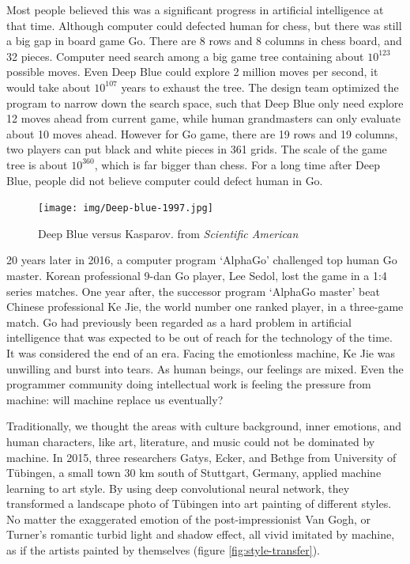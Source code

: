 \documentclass{article}
\begin{document}
Most people believed this was a significant progress in artificial intelligence at that time. Although computer could defected human for chess, but there was still a big gap in board game Go. There are 8 rows and 8 columns in chess board, and 32 pieces. Computer need search among a big game tree containing about $10^{123}$ possible moves. Even Deep Blue could explore 2 million moves per second, it would take about $10^{107}$ years to exhaust the tree. The design team optimized the program to narrow down the search space, such that Deep Blue only need explore 12 moves ahead from current game, while human grandmasters can only evaluate about 10 moves ahead. However for Go game, there are 19 rows and 19 columns, two players can put black and white pieces in 361 grids. The scale of the game tree is about $10^{360}$, which is far bigger than chess. For a long time after Deep Blue, people did not believe computer could defect human in Go.

\begin{figure}[htbp]
 \centering
 \texttt{[image: img/Deep-blue-1997.jpg]}
 \captionsetup{labelformat=empty}
 \caption{Deep Blue versus Kasparov. from {\em Scientific American}}
 \label{fig:Deep-blue-1997}
\end{figure}

20 years later in 2016, a computer program `AlphaGo' challenged top human Go master. Korean professional 9-dan Go player, Lee Sedol, lost the game in a 1:4 series matches. One year after, the successor program `AlphaGo master' beat Chinese professional Ke Jie, the world number one ranked player, in a three-game match. Go had previously been regarded as a hard problem in artificial intelligence that was expected to be out of reach for the technology of the time. It was considered the end of an era. Facing the emotionless machine, Ke Jie was unwilling and burst into tears. As human beings, our feelings are mixed. Even the programmer community doing intellectual work is feeling the pressure from machine: will machine replace us eventually?

Traditionally, we thought the areas with culture background, inner emotions, and human characters, like art, literature, and music could not be dominated by machine. In 2015, three researchers Gatys, Ecker, and Bethge from University of Tübingen, a small town 30 km south of Stuttgart, Germany, applied machine learning to art style. By using deep convolutional neural network, they transformed a landscape photo of Tübingen into art painting of different styles\cite{Gatys-2015}. No matter the exaggerated emotion of the post-impressionist Van Gogh, or Turner's romantic turbid light and shadow effect, all vivid imitated by machine, as if the artists painted by themselves (figure \ref{fig:style-transfer}).
\end{document}
